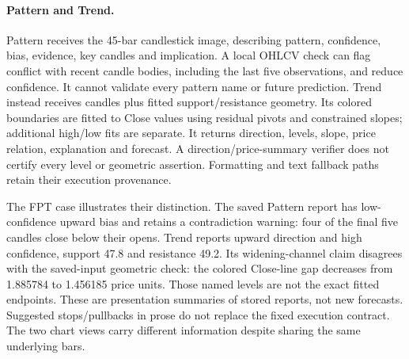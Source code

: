 \paragraph{Pattern and Trend.}
Pattern receives the 45-bar candlestick image, describing pattern,
confidence, bias, evidence, key candles and implication. A local OHLCV
check can flag conflict with recent candle bodies, including the last
five observations, and reduce confidence. It cannot validate every
pattern name or future prediction. Trend instead receives candles plus
fitted support/resistance geometry. Its colored boundaries are fitted
to Close values using residual pivots and constrained slopes; additional
high/low fits are separate. It returns direction, levels, slope, price
relation, explanation and forecast. A direction/price-summary verifier
does not certify every level or geometric assertion. Formatting and text
fallback paths retain their execution provenance.

The FPT case illustrates their distinction. The saved Pattern report
has low-confidence upward bias and retains a contradiction warning:
four of the final five candles close below their opens. Trend reports
upward direction and high confidence, support 47.8 and resistance 49.2.
Its widening-channel claim disagrees with the saved-input geometric
check: the colored Close-line gap decreases from 1.885784 to 1.456185
price units. Those named levels are not the exact fitted endpoints.
These are presentation summaries of stored reports, not new forecasts.
Suggested stops/pullbacks in prose do not replace the fixed execution
contract. The two chart views carry different information despite
sharing the same underlying bars.


